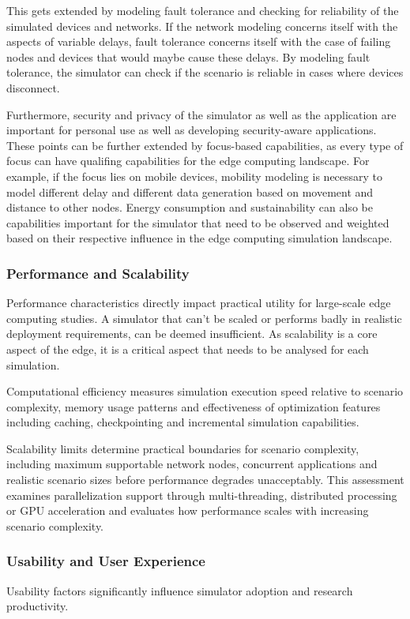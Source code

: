 This gets extended by modeling fault tolerance and checking for reliability of the simulated devices and networks.
If the network modeling concerns itself with the aspects of variable delays, fault tolerance concerns itself with the case of failing nodes and devices that would maybe cause these delays.
By modeling fault tolerance, the simulator can check if the scenario is reliable in cases where devices disconnect. 

Furthermore, security and privacy of the simulator as well as the application are important for personal use as well as developing security-aware applications.
These points can be further extended by focus-based capabilities, as every type of focus can have qualifing capabilities for the edge computing landscape.
For example, if the focus lies on mobile devices, mobility modeling is necessary to model different delay and different data generation based on movement and distance to other nodes.
Energy consumption and sustainability can also be capabilities important for the simulator that need to be observed and weighted based on their respective influence in the edge computing simulation landscape.

\subsubsection{Performance and Scalability}
Performance characteristics directly impact practical utility for large-scale edge computing studies.
A simulator that can't be scaled or performs badly in realistic deployment requirements, can be deemed insufficient.
As scalability is a core aspect of the edge, it is a critical aspect that needs to be analysed for each simulation.

Computational efficiency measures simulation execution speed relative to scenario complexity, memory usage patterns and effectiveness of optimization features including caching, checkpointing and incremental simulation capabilities.

Scalability limits determine practical boundaries for scenario complexity, including maximum supportable network nodes, concurrent applications and realistic scenario sizes before performance degrades unacceptably.
This assessment examines parallelization support through multi-threading, distributed processing or GPU acceleration and evaluates how performance scales with increasing scenario complexity.

\subsubsection{Usability and User Experience}
Usability factors significantly influence simulator adoption and research productivity.

